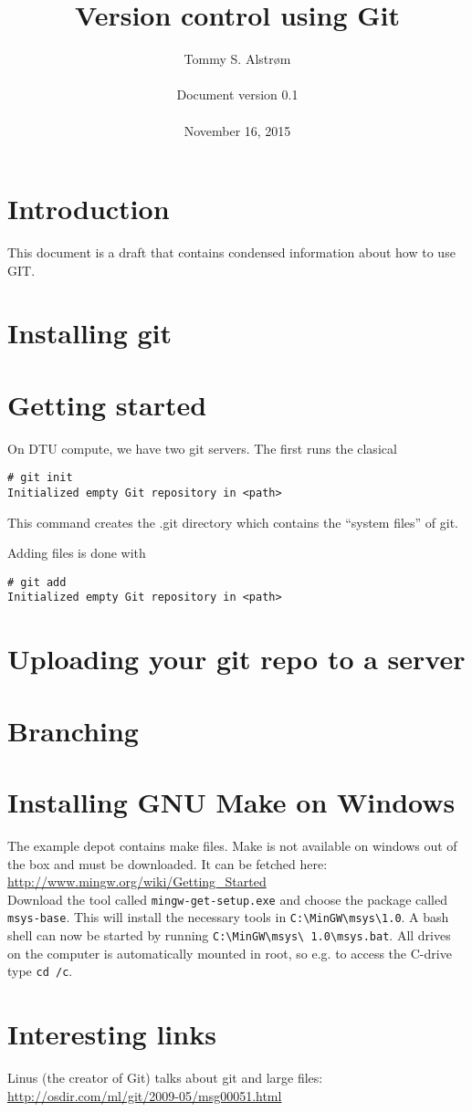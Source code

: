 \documentclass[10pt,a4paper]{article}
\title{Version control using Git}
\author{Tommy S. Alstrøm \\\\
Document version 0.1\\\\
November 16, 2015}
\date{\vspace{-5ex}}
\begin{document}
\maketitle
\section{Introduction}
This document is a draft that contains condensed information about how to use GIT.


\section{Installing git}



\section{Getting started}
On DTU compute, we have two git servers. The first runs the clasical 

\begin{lstlisting}
# git init
Initialized empty Git repository in <path>
\end{lstlisting}
This command creates the .git directory which contains the ``system files'' of git.

Adding files is done with
\begin{lstlisting}
# git add
Initialized empty Git repository in <path>
\end{lstlisting}


\section{Uploading your git repo to a server}


\section{Branching}


\section{Installing GNU Make on Windows}
The example depot contains make files. Make is not available on windows out of 
the box and must be downloaded. It can be fetched here:\\ 
\url{http://www.mingw.org/wiki/Getting_Started}\\ Download the tool called 
\texttt{mingw-get-setup.exe} and choose the package called \texttt{msys-base}. 
This will install the necessary tools in 
\texttt{C:\textbackslash{}MinGW\textbackslash{}msys\textbackslash{}1.0}. A bash 
shell can now be started by running 
\texttt{C:\textbackslash{}MinGW\textbackslash{}msys\textbackslash{} 
1.0\textbackslash{}msys.bat}. All drives on the computer is automatically 
mounted in root, so e.g. to access the C-drive type \texttt{cd /c}.

\section{Interesting links}
Linus (the creator of Git) talks about git and large files:\\
\url{http://osdir.com/ml/git/2009-05/msg00051.html}
\end{document}
